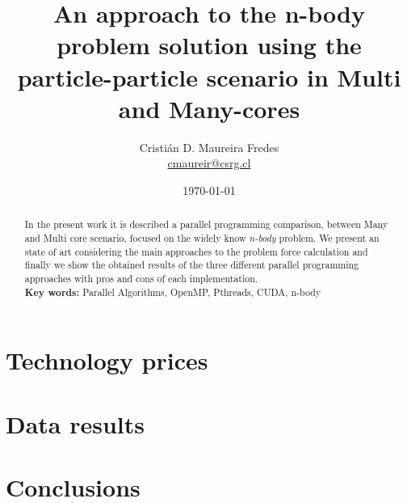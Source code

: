 \documentclass[letter, 10pt]{article}
\begin{document}
\pagestyle{empty}

\title{An approach to the n-body problem solution using the particle-particle scenario in Multi and Many-cores}
\author{Cristián D. Maureira Fredes\\\url{cmaureir@csrg.cl}}
\date{\today}

\maketitle
\begin{abstract}
In the present work it is described a parallel programming
comparison, between Many and Multi core scenario,
focused on the widely know \emph{n-body} problem.
We present an state of art considering the main approaches to
the problem force calculation and finally
we show the obtained results of the three different
parallel programming approaches with pros and cons
of each implementation.
\\
\textbf{Key words:} Parallel Algorithms, OpenMP, Pthreads, CUDA, n-body

\end{abstract}

%
%
%
%
%
%
%
%
%
%
%
%
%
%
%
\newpage
\section{Technology prices}


\newpage
\section{Data results}


\newpage
\section{Conclusions}

\end{document}
